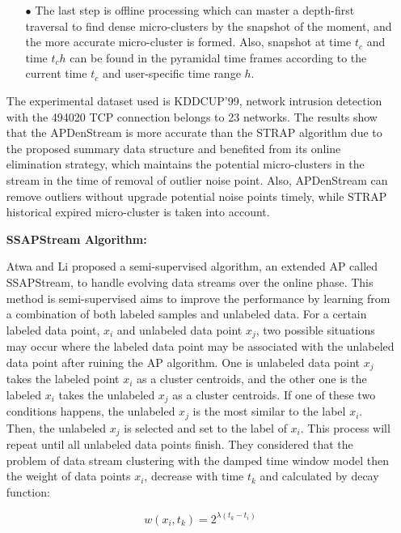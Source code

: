 \documentclass[../UNBThesis2.tex]{subfiles}
\begin{document}
\begin{itemize}[leftmargin=*]
\begin{itemize}
   \item[$\bullet$] The last step is offline processing which can master a depth-first traversal to find dense micro-clusters by the snapshot of the moment, and the more accurate micro-cluster is formed. Also, snapshot at time $t_c$ and time $t_ch$ can be found in the pyramidal time frames according to the current time $t_c$ and user-specific time range $h$. 
\end{itemize}



The experimental dataset used is KDDCUP'99, network intrusion detection with the 494020 TCP connection belongs to 23 networks. The results show that the APDenStream is more accurate than the STRAP algorithm due to the proposed summary data structure and benefited from its online elimination strategy, which maintains the potential micro-clusters in the stream in the time of removal of outlier noise point.
Also, APDenStream can remove outliers without upgrade potential noise points timely, while STRAP historical expired micro-cluster is taken into account.



\item[]\textbf{SSAPStream Algorithm:}

Atwa and Li \cite{atwa2015affinity} proposed a semi-supervised algorithm, an extended AP called SSAPStream, to handle evolving data streams over the online phase. This method is semi-supervised aims to improve the performance by learning from a combination of both labeled samples and unlabeled data. For a certain labeled data point, $x_i$ and unlabeled data point $x_j$, two possible situations may occur where the labeled data point may be associated with the unlabeled data point after ruining the AP algorithm. One is unlabeled data point $x_j$ takes the labeled point $x_i$ as a cluster centroids, and the other one is the labeled $x_i$ takes the unlabeled $x_j$ as a cluster centroids. If one of these two conditions happens, the unlabeled $x_j$ is the most similar to the label $x_i$. Then, the unlabeled $x_j$ is selected and set to the label of $x_i$. This process will repeat until all unlabeled data points finish.
They considered that the problem of data stream clustering with the damped time window model then the weight of data points $x_i$, decrease with time $t_k$ and calculated by decay function:

\begin{equation}
    w(x_i, t_k) = 2^{\lambda(t_k - t_i)}
\end{equation}


\end{itemize}
\end{document}
